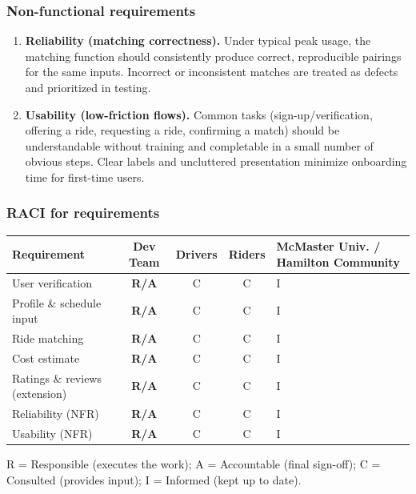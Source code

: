 \documentclass[12pt,letterpaper]{article}
\begin{document}
\subsubsection*{Non-functional requirements}
\begin{enumerate}
  \item \textbf{Reliability (matching correctness).}
  Under typical peak usage, the matching function should consistently produce correct, reproducible pairings for the same inputs.
  Incorrect or inconsistent matches are treated as defects and prioritized in testing.

  \item \textbf{Usability (low-friction flows).}
  Common tasks (sign-up/verification, offering a ride, requesting a ride, confirming a match) should be understandable without training and completable in a small number of obvious steps.
  Clear labels and uncluttered presentation minimize onboarding time for first-time users.
\end{enumerate}

\subsubsection*{RACI for requirements}
\begin{center}
\begin{tabularx}{\textwidth}{@{}l c c c >{\raggedright\arraybackslash}X@{}}
\hline
\textbf{Requirement} & \textbf{Dev Team} & \textbf{Drivers} & \textbf{Riders} & \textbf{McMaster Univ. / Hamilton Community} \\
\hline
User verification & \textbf{R/A} & C & C & I \\
Profile \& schedule input & \textbf{R/A} & C & C & I \\
Ride matching & \textbf{R/A} & C & C & I \\
Cost estimate & \textbf{R/A} & C & C & I \\
Ratings \& reviews (extension) & \textbf{R/A} & C & C & I \\
Reliability (NFR) & \textbf{R/A} & C & C & I \\
Usability (NFR) & \textbf{R/A} & C & C & I \\
\hline
\end{tabularx}
\end{center}

 R = Responsible (executes the work); A = Accountable (final sign-off); C = Consulted (provides input); I = Informed (kept up to date).
\end{document}
